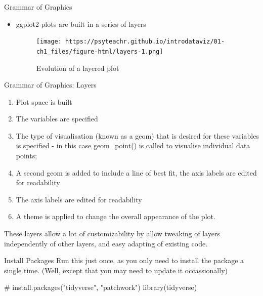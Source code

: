 \documentclass[
  ignorenonframetext,
]{beamer}
\newenvironment{Shaded}{\begin{snugshade}}{\end{snugshade}}
\newcommand{\CommentTok}[1]{\textcolor[rgb]{0.37,0.37,0.37}{#1}}
\newcommand{\FunctionTok}[1]{\textcolor[rgb]{0.28,0.35,0.67}{#1}}
\newcommand{\NormalTok}[1]{\textcolor[rgb]{0.00,0.23,0.31}{#1}}
\begin{document}
\begin{frame}{Grammar of Graphics}
\protect\hypertarget{grammar-of-graphics}{}
\begin{itemize}
\item
  ggplot2 plots are built in a series of layers

  \begin{figure}

  {\centering \texttt{[image: https://psyteachr.github.io/introdataviz/01-ch1\_files/figure-html/layers-1.png]}

  }

  \caption{Evolution of a layered plot}

  \end{figure}
\end{itemize}
\end{frame}

\begin{frame}{Grammar of Graphics: Layers}
\protect\hypertarget{grammar-of-graphics-layers}{}
\begin{enumerate}
\item
  Plot space is built
\item
  The variables are specified
\item
  The type of visualisation (known as a geom) that is desired for these
  variables is specified - in this case geom\_point() is called to
  visualise individual data points;
\item
  A second geom is added to include a line of best fit, the axis labels
  are edited for readability
\item
  The axis labels are edited for readability
\item
  A theme is applied to change the overall appearance of the plot.
\end{enumerate}

These layers allow a lot of customizability by allow tweaking of layers
independently of other layers, and easy adapting of existing code.
\end{frame}

\begin{frame}[fragile]{Install Packages}
\protect\hypertarget{install-packages}{}
Run this just once, as you only need to install the package a single
time. (Well, except that you may need to update it occassionally)

\begin{Shaded}
\begin{Highlighting}[]
\CommentTok{\# install.packages("tidyverse", "patchwork")}
\FunctionTok{library}\NormalTok{(tidyverse)}
\end{Highlighting}
\end{Shaded}
\end{frame}
\end{document}
